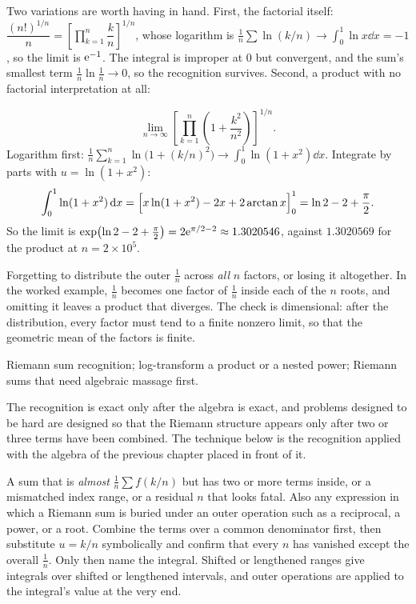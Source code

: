 Two variations are worth having in hand. First, the factorial itself: $\dfrac{(n!)^{1/n}}{n}=\left[\prod_{k=1}^{n}\dfrac kn\right]^{1/n}$, whose logarithm is $\tfrac1n\sum\ln(k/n)\to\int_{0}^{1}\ln x\dd x=-1$, so the limit is $\mathrm{e}^{-1}$. The integral is improper at $0$ but convergent, and the sum's smallest term $\tfrac1n\ln\tfrac1n\to0$, so the recognition survives. Second, a product with no factorial interpretation at all:

\begin{worked}
\[\lim_{n\to\infty}\left[\prod_{k=1}^{n}\left(1+\frac{k^{2}}{n^{2}}\right)\right]^{1/n}.\]
Logarithm first: $\tfrac1n\sum_{k=1}^{n}\ln\bigl(1+(k/n)^{2}\bigr)\to\displaystyle\int_{0}^{1}\ln(1+x^{2})\dd x$. Integrate by parts with $u=\ln(1+x^{2})$:
\[\int_{0}^{1}\ln(1+x^{2})\,\mathrm{d} x=\Bigl[x\ln(1+x^{2})-2x+2\arctan x\Bigr]_{0}^{1}=\ln2-2+\frac{\pi}{2}.\]
So the limit is $\exp\bigl(\ln2-2+\tfrac\pi2\bigr)=2\mathrm{e}^{\pi/2-2}\approx1.3020546$, against $1.3020569$ for the product at $n=2\times10^{5}$.
\end{worked}

\begin{trap}
Forgetting to distribute the outer $\tfrac1n$ across \emph{all} $n$ factors, or losing it altogether. In the worked example, $\tfrac1n$ becomes one factor of $\tfrac1n$ inside each of the $n$ roots, and omitting it leaves a product that diverges. The check is dimensional: after the distribution, every factor must tend to a finite nonzero limit, so that the geometric mean of the factors is finite.
\end{trap}

\begin{seealsob}Riemann sum recognition; log-transform a product or a nested power; Riemann sums that need algebraic massage first.\end{seealsob}

The recognition is exact only after the algebra is exact, and problems designed to be hard are designed so that the Riemann structure appears only after two or three terms have been combined. The technique below is the recognition applied with the algebra of the previous chapter placed in front of it.

\cue A sum that is \emph{almost} $\tfrac1n\sum f(k/n)$ but has two or more terms inside, or a mismatched index range, or a residual $n$ that looks fatal. Also any expression in which a Riemann sum is buried under an outer operation such as a reciprocal, a power, or a root.
\method Combine the terms over a common denominator first, then substitute $u=k/n$ symbolically and confirm that every $n$ has vanished except the overall $\tfrac1n$. Only then name the integral. Shifted or lengthened ranges give integrals over shifted or lengthened intervals, and outer operations are applied to the integral's value at the very end.


